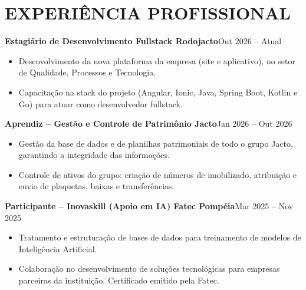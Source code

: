 \documentclass[9pt,a4paper]{extarticle}
\newcommand{\entry}[2]{\vspace{2pt}\noindent\textbf{#1}\hfill{\color{gray}#2}\par}
\begin{document}
\section*{EXPERIÊNCIA PROFISSIONAL}
\entry{Estagiário de Desenvolvimento Fullstack \textperiodcentered{} Rodojacto}{Out 2026 – Atual}
\begin{itemize}
  \item Desenvolvimento da nova plataforma da empresa (site e aplicativo), no setor de Qualidade, Processos e Tecnologia.
  \item Capacitação na stack do projeto (Angular, Ionic, Java, Spring Boot, Kotlin e Go) para atuar como desenvolvedor fullstack.
\end{itemize}
\entry{Aprendiz – Gestão e Controle de Patrimônio \textperiodcentered{} Jacto}{Jan 2026 – Out 2026}
\begin{itemize}
  \item Gestão da base de dados e de planilhas patrimoniais de todo o grupo Jacto, garantindo a integridade das informações.
  \item Controle de ativos do grupo: criação de números de imobilizado, atribuição e envio de plaquetas, baixas e transferências.
\end{itemize}
\entry{Participante – Inovaskill (Apoio em IA) \textperiodcentered{} Fatec Pompéia}{Mar 2025 – Nov 2025}
\begin{itemize}
  \item Tratamento e estruturação de bases de dados para treinamento de modelos de Inteligência Artificial.
  \item Colaboração no desenvolvimento de soluções tecnológicas para empresas parceiras da instituição. Certificado emitido pela Fatec.
\end{itemize}
\end{document}
